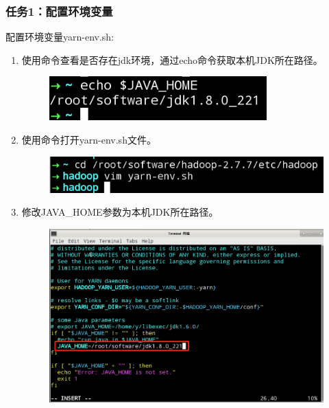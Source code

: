 \documentclass {article}
\begin{document}
			\subsubsection{任务1：配置环境变量}
				配置环境变量yarn-env.sh:
				\begin{enumerate}
					\item 使用命令查看是否存在jdk环境，通过echo命令获取本机JDK所在路径。
					\begin{figure}[H]
						\centering
						\includegraphics{figures/fig32.png}
					\end{figure}
				
					\item 使用命令打开yarn-env.sh文件。
					\begin{figure}[H]
						\centering
						\includegraphics{figures/fig33.png}
					\end{figure}
				
					\item 修改JAVA\_HOME参数为本机JDK所在路径。
					\begin{figure}[H]
						\centering
						\includegraphics[width=4.5in]{figures/fig34.png}
					\end{figure}
				\end{enumerate}
			
\end{document}
